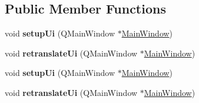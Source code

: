 \subsection*{Public Member Functions}
\begin{DoxyCompactItemize}
\item 
\hypertarget{class_ui___main_window_acf4a0872c4c77d8f43a2ec66ed849b58}{void {\bfseries setup\-Ui} (Q\-Main\-Window $\ast$\hyperlink{class_main_window}{Main\-Window})}\label{class_ui___main_window_acf4a0872c4c77d8f43a2ec66ed849b58}

\item 
\hypertarget{class_ui___main_window_a097dd160c3534a204904cb374412c618}{void {\bfseries retranslate\-Ui} (Q\-Main\-Window $\ast$\hyperlink{class_main_window}{Main\-Window})}\label{class_ui___main_window_a097dd160c3534a204904cb374412c618}

\item 
\hypertarget{class_ui___main_window_acf4a0872c4c77d8f43a2ec66ed849b58}{void {\bfseries setup\-Ui} (Q\-Main\-Window $\ast$\hyperlink{class_main_window}{Main\-Window})}\label{class_ui___main_window_acf4a0872c4c77d8f43a2ec66ed849b58}

\item 
\hypertarget{class_ui___main_window_a097dd160c3534a204904cb374412c618}{void {\bfseries retranslate\-Ui} (Q\-Main\-Window $\ast$\hyperlink{class_main_window}{Main\-Window})}\label{class_ui___main_window_a097dd160c3534a204904cb374412c618}

\end{DoxyCompactItemize}
